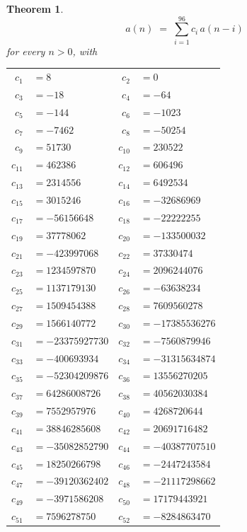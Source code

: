 \documentclass[11pt,a4paper]{article}
\theoremstyle{plain}
\newtheorem{theorem}{Theorem}
\theoremstyle{definition}
\begin{document}
\begin{theorem}
\[
a(n)\;=\;\sum_{i=1}^{96}c_i\,a(n-i)
\]
for every $n>0$, with
\begin{center}\footnotesize
\begin{tabular}{r@{\,}l@{\qquad}r@{\,}l}
$c_{1}$ & $=8$ & $c_{2}$ & $=0$ \\
$c_{3}$ & $=-18$ & $c_{4}$ & $=-64$ \\
$c_{5}$ & $=-144$ & $c_{6}$ & $=-1023$ \\
$c_{7}$ & $=-7462$ & $c_{8}$ & $=-50254$ \\
$c_{9}$ & $=51730$ & $c_{10}$ & $=230522$ \\
$c_{11}$ & $=462386$ & $c_{12}$ & $=606496$ \\
$c_{13}$ & $=2314556$ & $c_{14}$ & $=6492534$ \\
$c_{15}$ & $=3015246$ & $c_{16}$ & $=-32686969$ \\
$c_{17}$ & $=-56156648$ & $c_{18}$ & $=-22222255$ \\
$c_{19}$ & $=37778062$ & $c_{20}$ & $=-133500032$ \\
$c_{21}$ & $=-423997068$ & $c_{22}$ & $=37330474$ \\
$c_{23}$ & $=1234597870$ & $c_{24}$ & $=2096244076$ \\
$c_{25}$ & $=1137179130$ & $c_{26}$ & $=-63638234$ \\
$c_{27}$ & $=1509454388$ & $c_{28}$ & $=7609560278$ \\
$c_{29}$ & $=1566140772$ & $c_{30}$ & $=-17385536276$ \\
$c_{31}$ & $=-23375927730$ & $c_{32}$ & $=-7560879946$ \\
$c_{33}$ & $=-400693934$ & $c_{34}$ & $=-31315634874$ \\
$c_{35}$ & $=-52304209876$ & $c_{36}$ & $=13556270205$ \\
$c_{37}$ & $=64286008726$ & $c_{38}$ & $=40562030384$ \\
$c_{39}$ & $=7552957976$ & $c_{40}$ & $=4268720644$ \\
$c_{41}$ & $=38846285608$ & $c_{42}$ & $=20691716482$ \\
$c_{43}$ & $=-35082852790$ & $c_{44}$ & $=-40387707510$ \\
$c_{45}$ & $=18250266798$ & $c_{46}$ & $=-2447243584$ \\
$c_{47}$ & $=-39120362402$ & $c_{48}$ & $=-21117298662$ \\
$c_{49}$ & $=-3971586208$ & $c_{50}$ & $=17179443921$ \\
$c_{51}$ & $=7596278750$ & $c_{52}$ & $=-8284863470$ \\

\end{tabular}
\end{center}
\end{theorem}
\end{document}
